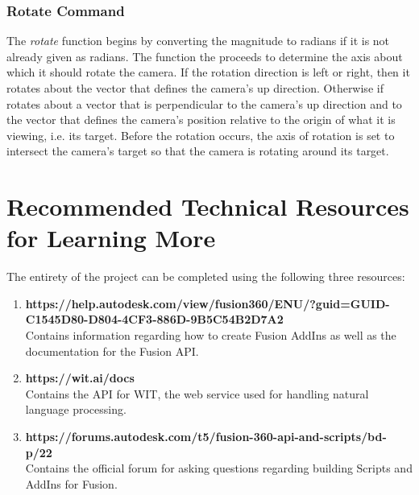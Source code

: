 \documentclass[onecolumn, draftclsnofoot,10pt, compsoc]{IEEEtran}
\begin{document}
\subsubsection{Rotate Command} 
The \textit{rotate} function begins by converting the magnitude to radians if it is not already given as radians.
The function the proceeds to determine the axis about which it should rotate the camera.
If the rotation direction is left or right, then it rotates about the vector that defines the camera's up direction.
Otherwise if rotates about a vector that is perpendicular to the camera's up direction and to the vector that defines the camera's position relative to the origin of what it is viewing, i.e. its target.
Before the rotation occurs, the axis of rotation is set to intersect the camera's target so that the camera is rotating around its target.







\section{Recommended Technical Resources for Learning More}
	The entirety of the project can be completed using the following three resources:

	\begin{enumerate}
		\item \textbf{https://help.autodesk.com/view/fusion360/ENU/?guid=GUID-C1545D80-D804-4CF3-886D-9B5C54B2D7A2} \\
			Contains information regarding how to create Fusion AddIns as well as the documentation for the Fusion API.
		\item \textbf{https://wit.ai/docs} \\
			Contains the API for WIT, the web service used for handling natural language processing.
		\item \textbf{https://forums.autodesk.com/t5/fusion-360-api-and-scripts/bd-p/22} \\
			Contains the official forum for asking questions regarding building Scripts and AddIns for Fusion.
	\end{enumerate}
\end{document}
